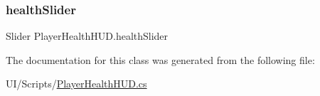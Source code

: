 \subsubsection{\texorpdfstring{health\+Slider}{healthSlider}}
{\footnotesize\ttfamily Slider Player\+Health\+H\+U\+D.\+health\+Slider}



The documentation for this class was generated from the following file\+:\begin{DoxyCompactItemize}
\item 
U\+I/\+Scripts/\mbox{\hyperlink{_player_health_h_u_d_8cs}{Player\+Health\+H\+U\+D.\+cs}}\end{DoxyCompactItemize}
